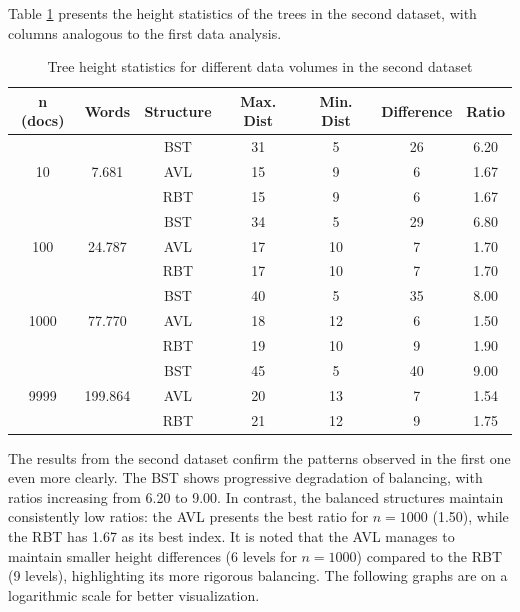  Table \ref{tab:altura_db2} presents the height statistics of the trees in the second dataset,
 with columns analogous to the first data analysis.

 \begin{table}[H]
     \centering
     \begin{tabular}{|c|c|c|c|c|c|c|}
     \hline
     \textbf{n (docs)} & \textbf{Words} & \textbf{Structure} & \textbf{Max. Dist} & \textbf{Min. Dist} & \textbf{Difference} & \textbf{Ratio} \\
     \hline
     \multirow{3}{*}{10} & \multirow{3}{*}{7.681} & BST & 31 & 5 & 26 & 6.20 \\
     & & AVL & 15 & 9 & 6 & 1.67 \\
     & & RBT & 15 & 9 & 6 & 1.67 \\
     \hline
     \multirow{3}{*}{100} & \multirow{3}{*}{24.787} & BST & 34 & 5 & 29 & 6.80 \\
     & & AVL & 17 & 10 & 7 & 1.70 \\
     & & RBT & 17 & 10 & 7 & 1.70 \\
     \hline
     \multirow{3}{*}{1000} & \multirow{3}{*}{77.770} & BST & 40 & 5 & 35 & 8.00 \\
     & & AVL & 18 & 12 & 6 & 1.50 \\
     & & RBT & 19 & 10 & 9 & 1.90 \\
     \hline
     \multirow{3}{*}{9999} & \multirow{3}{*}{199.864} & BST & 45 & 5 & 40 & 9.00 \\
     & & AVL & 20 & 13 & 7 & 1.54 \\
     & & RBT & 21 & 12 & 9 & 1.75 \\
     \hline
     \end{tabular}
     \caption{Tree height statistics for different data volumes in the second dataset}
     \label{tab:altura_db2}
 \end{table}

 The results from the second dataset confirm the patterns observed in the first one even more clearly.
 The BST shows progressive degradation of balancing, with ratios increasing from 6.20 to 9.00.
 In contrast, the balanced structures maintain consistently low ratios: the AVL presents the best ratio for $n=1000$ (1.50),
 while the RBT has 1.67 as its best index. It is noted that the AVL manages to maintain smaller height differences (6 levels for $n=1000$)
 compared to the RBT (9 levels), highlighting its more rigorous balancing. The following graphs
 are on a logarithmic scale for better visualization.

